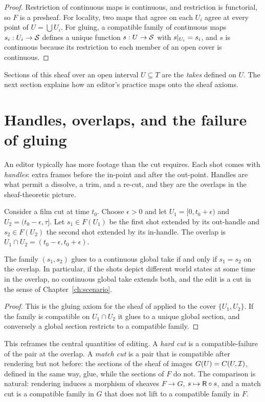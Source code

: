 \begin{proof}
Restriction of continuous maps is continuous, and restriction is functorial, so $F$ is a presheaf. For locality, two maps that agree on each $U_i$ agree at every point of $U=\bigcup U_i$. For gluing, a compatible family of continuous maps $s_i:U_i\to\mathcal{S}$ defines a unique function $s:U\to\mathcal{S}$ with $s|_{U_i}=s_i$, and $s$ is continuous because its restriction to each member of an open cover is continuous.
\end{proof}

Sections of this sheaf over an open interval $U\subseteq T$ are the \emph{takes} defined on $U$. The next section explains how an editor's practice maps onto the sheaf axioms.

\section{Handles, overlaps, and the failure of gluing}

An editor typically has more footage than the cut requires. Each shot comes with \emph{handles}: extra frames before the in-point and after the out-point. Handles are what permit a dissolve, a trim, and a re-cut, and they are the overlaps in the sheaf-theoretic picture.

Consider a film cut at time $t_0$. Choose $\epsilon>0$ and let $U_1=[0,t_0+\epsilon)$ and $U_2=(t_0-\epsilon,\tau]$. Let $s_1\in F(U_1)$ be the first shot extended by its out-handle and $s_2\in F(U_2)$ the second shot extended by its in-handle. The overlap is $U_1\cap U_2=(t_0-\epsilon,t_0+\epsilon)$.

\begin{proposition}\label{prop:cut-fails}
The family $(s_1,s_2)$ glues to a continuous global take if and only if $s_1=s_2$ on the overlap. In particular, if the shots depict different world states at some time in the overlap, no continuous global take extends both, and the edit is a cut in the sense of Chapter~\ref{ch:scenario}.
\end{proposition}

\begin{proof}
This is the gluing axiom for the sheaf of  applied to the cover $\{U_1,U_2\}$. If the family is compatible on $U_1\cap U_2$ it glues to a unique global section, and conversely a global section restricts to a compatible family.
\end{proof}

This reframes the central quantities of editing. A \emph{hard cut} is a compatible-failure of the pair at the overlap. A \emph{match cut} is a pair that is compatible after rendering but not before: the sections of the sheaf of images $G(U)=C(U,\mathcal{I})$, defined in the same way, glue, while the sections of $F$ do not. The comparison is natural: rendering induces a morphism of sheaves $F\to G$, $s\mapsto\mathsf{R}\circ s$, and a match cut is a compatible family in $G$ that does not lift to a compatible family in $F$.

